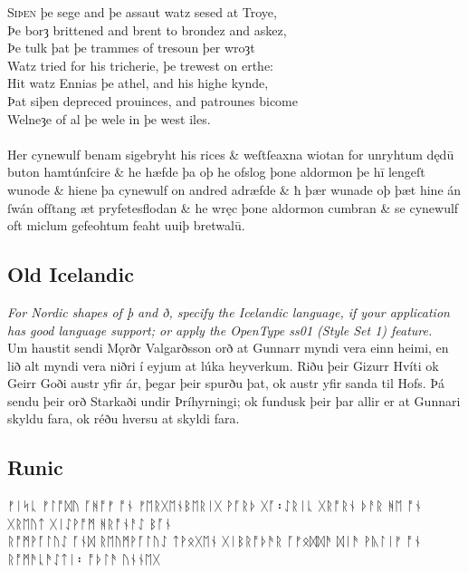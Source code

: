 \documentclass[12pt,a4paper,openany]{book}
\begin{document}
\noindent S{\scshape iþen} þe sege and þe assaut watz sesed at Troye,\\
Þe borȝ brittened and brent to brondez and askez,\\
Þe tulk þat þe trammes of tresoun þer wroȝt\\
Watz tried for his tricherie, þe trewest on erthe:\\
Hit watz Ennias þe athel, and his highe kynde,\\
Þat siþen depreced prouinces, and patrounes bicome\\
Welneȝe of al þe wele in þe west iles.\\

\\[1ex]
{
Her cynewulf benam sigebryht his rices \& weſtſeaxna wiotan for
un\-ryht\-um dędū buton hamtúnſcire \& he hæfde þa oþ he ofslog
þone aldormon þe hī lengeſt wunode \& hiene þa cynewulf on
andred adræfde \& ħ þær wunade oþ þæt hine án ſwán ofſtang
æt pryfetesflodan \& he wręc þone aldormon cumbran \& se cynewulf
oft miclum gefeohtum feaht uuiþ bretwalū.}



\subsection*{Old Icelandic}

{\small\itshape For Nordic shapes of þ and ð, specify the Icelandic
language, if your application has good language support; or apply the OpenType
ss01 (Style Set 1) feature.}\\[1ex]
Um haustit sendi Mǫrðr Valgarðsson orð at Gunnarr myndi vera einn heimi, en
lið alt myndi vera niðri í eyjum at lúka heyverkum. Riðu þeir Gizurr Hvíti ok
Geirr Goði austr yfir ár, þegar þeir spurðu þat, ok austr yfir sanda til Hofs.
Þá sendu þeir orð Starkaði undir Þríhyrningi; ok fundusk þeir þar allir er at
Gunnari skyldu fara, ok réðu hversu at skyldi fara.

\subsection*{Runic}
ᚠᛁᛋᚳ ᚠᛚᚩᛞᚢ ᚪᚻᚩᚠ ᚩᚾ ᚠᛖᚱᚷᛖᚾᛒᛖᚱᛁᚷ ᚹᚪᚱᚦ ᚷᚪ᛬ᛇᚱᛁᚳ ᚷᚱᚩᚱᚾ ᚦᚨᚱ ᚻᛖ ᚩᚾ ᚷᚱᛖᚢᛏ ᚷᛁᛇᚹᚩᛗ
ᚻᚱᚩᚾᚨᛇ ᛒᚪᚾ\\
ᚱᚩᛗᚹᚪᛚᚢᛇ ᚪᚾᛞ ᚱᛖᚢᛗᚹᚪᛚᚢᛇ ᛏᚹᛟᚷᛖᚾ ᚷᛁᛒᚱᚩᚦᚫᚱ ᚪᚠᛟᛞᛞᚫ ᛞᛁᚫ ᚹᚣᛚᛁᚠ ᚩᚾ ᚱᚩᛗᚫ\linebreak[0]ᚳᚫᛇᛏᛁ᛬
ᚩᚦᛚᚫ ᚢᚾᚾᛖᚷ
\end{document}
